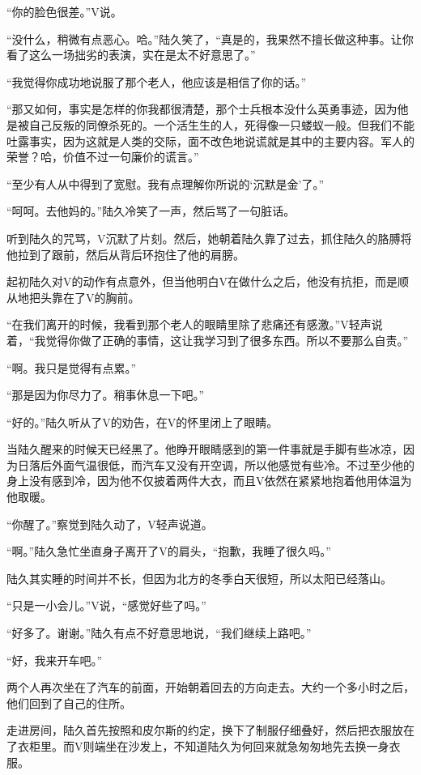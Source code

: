 “你的脸色很差。”V说。

“没什么，稍微有点恶心。哈。”陆久笑了，“真是的，我果然不擅长做这种事。让你看了这么一场拙劣的表演，实在是太不好意思了。”

“我觉得你成功地说服了那个老人，他应该是相信了你的话。”

“那又如何，事实是怎样的你我都很清楚，那个士兵根本没什么英勇事迹，因为他是被自己反叛的同僚杀死的。一个活生生的人，死得像一只蝼蚁一般。但我们不能吐露事实，因为这就是人类的交际，面不改色地说谎就是其中的主要内容。军人的荣誉？哈，价值不过一句廉价的谎言。”

“至少有人从中得到了宽慰。我有点理解你所说的‘沉默是金’了。”

“呵呵。去他妈的。”陆久冷笑了一声，然后骂了一句脏话。

听到陆久的咒骂，V沉默了片刻。然后，她朝着陆久靠了过去，抓住陆久的胳膊将他拉到了跟前，然后从背后环抱住了他的肩膀。

起初陆久对V的动作有点意外，但当他明白V在做什么之后，他没有抗拒，而是顺从地把头靠在了V的胸前。

“在我们离开的时候，我看到那个老人的眼睛里除了悲痛还有感激。”V轻声说着，“我觉得你做了正确的事情，这让我学习到了很多东西。所以不要那么自责。”

“啊。我只是觉得有点累。”

“那是因为你尽力了。稍事休息一下吧。”

“好的。”陆久听从了V的劝告，在V的怀里闭上了眼睛。

当陆久醒来的时候天已经黑了。他睁开眼睛感到的第一件事就是手脚有些冰凉，因为日落后外面气温很低，而汽车又没有开空调，所以他感觉有些冷。不过至少他的身上没有感到冷，因为他不仅披着两件大衣，而且V依然在紧紧地抱着他用体温为他取暖。

“你醒了。”察觉到陆久动了，V轻声说道。

“啊。”陆久急忙坐直身子离开了V的肩头，“抱歉，我睡了很久吗。”

陆久其实睡的时间并不长，但因为北方的冬季白天很短，所以太阳已经落山。

“只是一小会儿。”V说，“感觉好些了吗。”

“好多了。谢谢。”陆久有点不好意思地说，“我们继续上路吧。”

“好，我来开车吧。”

两个人再次坐在了汽车的前面，开始朝着回去的方向走去。大约一个多小时之后，他们回到了自己的住所。

走进房间，陆久首先按照和皮尔斯的约定，换下了制服仔细叠好，然后把衣服放在了衣柜里。而V则端坐在沙发上，不知道陆久为何回来就急匆匆地先去换一身衣服。

